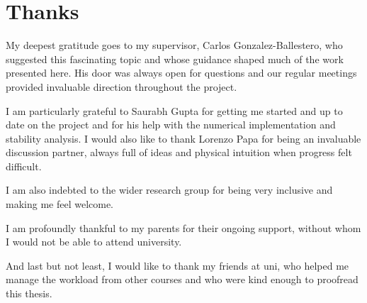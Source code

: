\chapter*{Thanks}

My deepest gratitude goes to my supervisor, Carlos Gonzalez-Ballestero, 
    who suggested this fascinating topic and whose guidance shaped much of the work presented here. 
His door was always open for questions 
    and our regular meetings provided invaluable direction throughout the project.

I am particularly grateful to Saurabh Gupta for getting me started and up to date on the project and for his help with the numerical implementation and stability analysis. 
I would also like to thank Lorenzo Papa for being an invaluable discussion partner,
    always full of ideas and physical intuition when progress felt difficult.

I am also indebted to the wider research group for being very inclusive and making me feel welcome.


I am profoundly thankful to my parents for their ongoing support,
    without whom I would not be able to attend university.

And last but not least, I would like to thank my friends at uni,
    who helped me manage the workload from other courses 
    and who were kind enough to proofread this thesis.